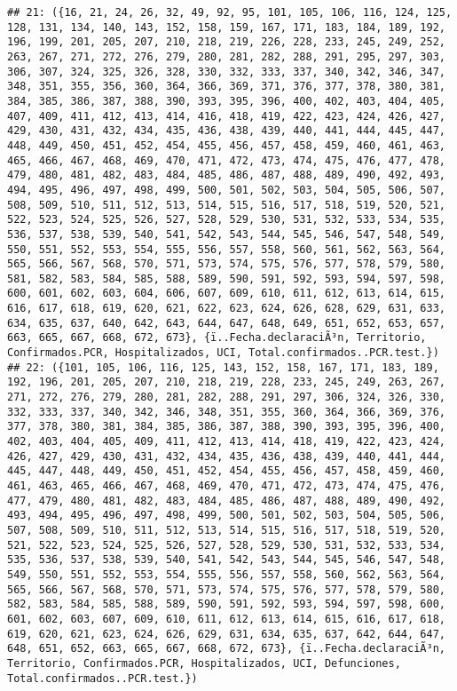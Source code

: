 \documentclass[
]{book}
\begin{document}
\begin{verbatim}
## 21: ({16, 21, 24, 26, 32, 49, 92, 95, 101, 105, 106, 116, 124, 125, 128, 131, 134, 140, 143, 152, 158, 159, 167, 171, 183, 184, 189, 192, 196, 199, 201, 205, 207, 210, 218, 219, 226, 228, 233, 245, 249, 252, 263, 267, 271, 272, 276, 279, 280, 281, 282, 288, 291, 295, 297, 303, 306, 307, 324, 325, 326, 328, 330, 332, 333, 337, 340, 342, 346, 347, 348, 351, 355, 356, 360, 364, 366, 369, 371, 376, 377, 378, 380, 381, 384, 385, 386, 387, 388, 390, 393, 395, 396, 400, 402, 403, 404, 405, 407, 409, 411, 412, 413, 414, 416, 418, 419, 422, 423, 424, 426, 427, 429, 430, 431, 432, 434, 435, 436, 438, 439, 440, 441, 444, 445, 447, 448, 449, 450, 451, 452, 454, 455, 456, 457, 458, 459, 460, 461, 463, 465, 466, 467, 468, 469, 470, 471, 472, 473, 474, 475, 476, 477, 478, 479, 480, 481, 482, 483, 484, 485, 486, 487, 488, 489, 490, 492, 493, 494, 495, 496, 497, 498, 499, 500, 501, 502, 503, 504, 505, 506, 507, 508, 509, 510, 511, 512, 513, 514, 515, 516, 517, 518, 519, 520, 521, 522, 523, 524, 525, 526, 527, 528, 529, 530, 531, 532, 533, 534, 535, 536, 537, 538, 539, 540, 541, 542, 543, 544, 545, 546, 547, 548, 549, 550, 551, 552, 553, 554, 555, 556, 557, 558, 560, 561, 562, 563, 564, 565, 566, 567, 568, 570, 571, 573, 574, 575, 576, 577, 578, 579, 580, 581, 582, 583, 584, 585, 588, 589, 590, 591, 592, 593, 594, 597, 598, 600, 601, 602, 603, 604, 606, 607, 609, 610, 611, 612, 613, 614, 615, 616, 617, 618, 619, 620, 621, 622, 623, 624, 626, 628, 629, 631, 633, 634, 635, 637, 640, 642, 643, 644, 647, 648, 649, 651, 652, 653, 657, 663, 665, 667, 668, 672, 673}, {ï..Fecha.declaraciÃ³n, Territorio, Confirmados.PCR, Hospitalizados, UCI, Total.confirmados..PCR.test.})
## 22: ({101, 105, 106, 116, 125, 143, 152, 158, 167, 171, 183, 189, 192, 196, 201, 205, 207, 210, 218, 219, 228, 233, 245, 249, 263, 267, 271, 272, 276, 279, 280, 281, 282, 288, 291, 297, 306, 324, 326, 330, 332, 333, 337, 340, 342, 346, 348, 351, 355, 360, 364, 366, 369, 376, 377, 378, 380, 381, 384, 385, 386, 387, 388, 390, 393, 395, 396, 400, 402, 403, 404, 405, 409, 411, 412, 413, 414, 418, 419, 422, 423, 424, 426, 427, 429, 430, 431, 432, 434, 435, 436, 438, 439, 440, 441, 444, 445, 447, 448, 449, 450, 451, 452, 454, 455, 456, 457, 458, 459, 460, 461, 463, 465, 466, 467, 468, 469, 470, 471, 472, 473, 474, 475, 476, 477, 479, 480, 481, 482, 483, 484, 485, 486, 487, 488, 489, 490, 492, 493, 494, 495, 496, 497, 498, 499, 500, 501, 502, 503, 504, 505, 506, 507, 508, 509, 510, 511, 512, 513, 514, 515, 516, 517, 518, 519, 520, 521, 522, 523, 524, 525, 526, 527, 528, 529, 530, 531, 532, 533, 534, 535, 536, 537, 538, 539, 540, 541, 542, 543, 544, 545, 546, 547, 548, 549, 550, 551, 552, 553, 554, 555, 556, 557, 558, 560, 562, 563, 564, 565, 566, 567, 568, 570, 571, 573, 574, 575, 576, 577, 578, 579, 580, 582, 583, 584, 585, 588, 589, 590, 591, 592, 593, 594, 597, 598, 600, 601, 602, 603, 607, 609, 610, 611, 612, 613, 614, 615, 616, 617, 618, 619, 620, 621, 623, 624, 626, 629, 631, 634, 635, 637, 642, 644, 647, 648, 651, 652, 663, 665, 667, 668, 672, 673}, {ï..Fecha.declaraciÃ³n, Territorio, Confirmados.PCR, Hospitalizados, UCI, Defunciones, Total.confirmados..PCR.test.})

\end{verbatim}
\end{document}
